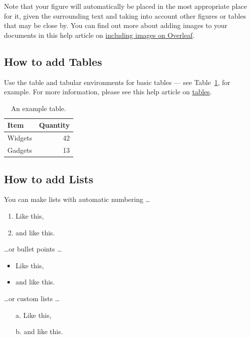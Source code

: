\documentclass[12pt,a4paper,faculty=ea,language=en,doctype=article]{ugent-doc}
\begin{document}
Note that your figure will automatically be placed in the most appropriate place for it, given the surrounding text and taking into account other figures or tables that may be close by.
You can find out more about adding images to your documents in this help article on \href{https://www.overleaf.com/learn/how-to/Including_images_on_Overleaf}{including images on Overleaf}.


\subsection{How to add Tables}

Use the table and tabular environments for basic tables --- see Table~\ref{tab:widgets}, for example.
For more information, please see this help article on \href{https://www.overleaf.com/learn/latex/tables}{tables}.

\begin{table}[h]
	\centering
	\begin{tabular}{l|r}
		Item    & Quantity \\\hline
		Widgets & 42       \\
		Gadgets & 13
	\end{tabular}
	\caption{\label{tab:widgets}An example table.}
\end{table}


\subsection{How to add Lists}

You can make lists with automatic numbering \dots

\begin{enumerate}
	\item Like this,
	\item and like this.
\end{enumerate}
\dots or bullet points \dots
\begin{itemize}
	\item Like this,
	\item and like this.
\end{itemize}
\dots or custom lists \dots
\begin{itemize}
	\item[a.] Like this,
	\item[b.] and like this.
\end{itemize}
\end{document}
